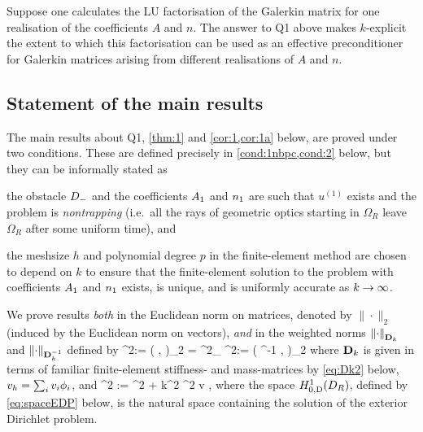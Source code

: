 
Suppose one calculates the LU factorisation of the Galerkin matrix for one realisation of the coefficients $A$ and $n$. The answer to Q1 above makes $k$-explicit the extent to which this factorisation can be used as an effective preconditioner for Galerkin matrices arising from different realisations of $A$ and $n$.

\subsection{Statement of the main results}\label{sec:main}
The main results about Q1, \cref{thm:1} and \cref{cor:1,cor:1a} below, are proved under two conditions. These are defined precisely in \cref{cond:1nbpc,cond:2} below, but they can be informally stated as 
\bit
\item the obstacle $D_{-}$ and the coefficients $A_{1}$ and $n_{1}$ are such that $u^{(1)}$ exists and the problem is \emph{nontrapping} (i.e.~all the rays of geometric optics starting in $\Omega_R$ leave $\Omega_R$ after some uniform time), and
\item the meshsize $h$ and polynomial degree $p$ in the finite-element method are chosen to depend on $k$ to ensure that the 
finite-element solution to the problem with coefficients $A_{1}$ and $n_{1}$ exists, is unique, and 
is uniformly accurate as $k\rightarrow \infty$. 
\eit 

We prove results \emph{both} in the Euclidean norm on matrices, denoted by $\|\cdot\|_2$ (induced by the Euclidean norm on vectors), \emph{and} in the weighted norms $\NDmatk{\cdot}$ and $\NDmatkI{\cdot}$ defined by 
\beq\label{eq:Dk}
\NDmatk{\bv}^2:= \big( \Dmatk \bv, \bv\big)_2 = %
^2_{\HokDR}
\quad \tand
\quad \NDmatkI{\bv}^2:= \big( \Dmatk^{-1} \bv, \bv\big)_2 %
\eeq
where $\mathbf{D}_{k}$ is given in terms of familiar finite-element stiffness- and mass-matrices by \cref{eq:Dk2} below, 
$v_{h} =\sum_i v_{i} \phi_{i}$, and 
\beq\label{eq:1knorm}
^2 := ^2 + k^2 ^2 \quad \tfor v \in \HozDDR,
\eeq{}
where the space $\HozDDR$, defined by \cref{eq:spaceEDP} below, is the natural space containing the solution of the exterior Dirichlet problem. 

